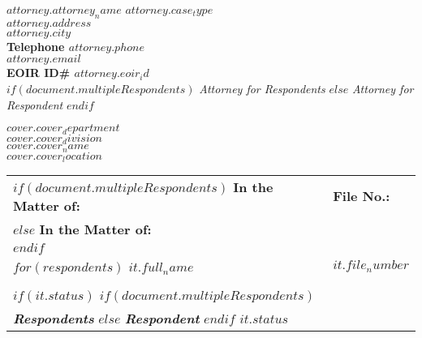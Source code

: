 \documentclass[12pt]{letter}
\date{}
\begin{document}
\begin{letter}{}
  \begin{flushleft}
    \textbf{$attorney.attorney_name$} \hfill \textbf{$attorney.case_type$} \\
    \textbf{$attorney.address$} \\
    \textbf{$attorney.city$} \\
    \textbf{Telephone $attorney.phone$} \\
    \textbf{$attorney.email$} \\
    \textbf{EOIR ID\# $attorney.eoir_id$} \\ 
    $if(document.multipleRespondents)$
      \textit{Attorney for Respondents}
    $else$
      \textit{Attorney for Respondent}
    $endif$ 

  \end{flushleft}
  
  \vspace{2em}
  
  \begin{center}
    \textbf{$cover.cover_department$} \\
    \textbf{$cover.cover_division$} \\
    \textbf{$cover.cover_name$} \\
    \textbf{$cover.cover_location$}
  \end{center}
  
  \vspace{2em}
   
\makebox[0.5\textwidth]{\hrulefill}
\begin{flushleft}
    \begin{tabular}{ p{} | p{} }


      $if(document.multipleRespondents)$
        \textbf{In the Matter of:} & \textbf{\hspace{1em}File No.:} \\
      $else$
        \textbf{In the Matter of:} \\
      $endif$ 

      \vspace{.0em} & \\ 

      $for(respondents)$
        \textbf{$it.full_name$} & \textbf{\hspace{1em}$it.file_number$} \\ \\
        $if(it.status)$ 
          $if(document.multipleRespondents)$
            \vspace{.0em} & \\ 
            \textit{\textbf{Respondents}}
          $else$
            \textit{\textbf{Respondent}} 
          $endif$ 
          \textbf{$it.status$}


\end{tabular}
\end{flushleft}
\end{letter}
\end{document}
